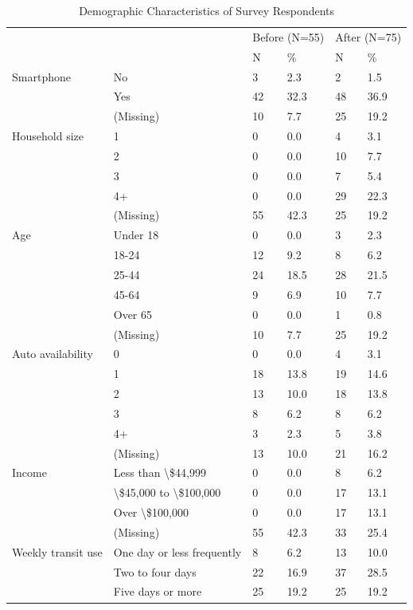\documentclass[smartcities,article,submit,moreauthors,pdftex]{mdpi}
\begin{document}
\begin{table}

\caption{\label{tab:survey-respondents}Demographic Characteristics of Survey Respondents}
\centering
\begin{tabular}[t]{llllll}
\toprule
\multicolumn{2}{c}{ } & \multicolumn{2}{c}{Before (N=55)} & \multicolumn{2}{c}{After (N=75)} \\
\cmidrule(l{3pt}r{3pt}){3-4} \cmidrule(l{3pt}r{3pt}){5-6}
  &    & N & \% & N  & \% \\
\midrule
Smartphone & No & 3 & 2.3 & 2 & 1.5\\
 & Yes & 42 & 32.3 & 48 & 36.9\\
 & (Missing) & 10 & 7.7 & 25 & 19.2\\
Household size & 1 & 0 & 0.0 & 4 & 3.1\\
 & 2 & 0 & 0.0 & 10 & 7.7\\
 & 3 & 0 & 0.0 & 7 & 5.4\\
 & 4+ & 0 & 0.0 & 29 & 22.3\\
 & (Missing) & 55 & 42.3 & 25 & 19.2\\
Age & Under 18 & 0 & 0.0 & 3 & 2.3\\
 & 18-24 & 12 & 9.2 & 8 & 6.2\\
 & 25-44 & 24 & 18.5 & 28 & 21.5\\
 & 45-64 & 9 & 6.9 & 10 & 7.7\\
 & Over 65 & 0 & 0.0 & 1 & 0.8\\
 & (Missing) & 10 & 7.7 & 25 & 19.2\\
Auto availability & 0 & 0 & 0.0 & 4 & 3.1\\
 & 1 & 18 & 13.8 & 19 & 14.6\\
 & 2 & 13 & 10.0 & 18 & 13.8\\
 & 3 & 8 & 6.2 & 8 & 6.2\\
 & 4+ & 3 & 2.3 & 5 & 3.8\\
 & (Missing) & 13 & 10.0 & 21 & 16.2\\
Income & Less than \textbackslash{}\$44,999 & 0 & 0.0 & 8 & 6.2\\
 & \textbackslash{}\$45,000 to \textbackslash{}\$100,000 & 0 & 0.0 & 17 & 13.1\\
 & Over \textbackslash{}\$100,000 & 0 & 0.0 & 17 & 13.1\\
 & (Missing) & 55 & 42.3 & 33 & 25.4\\
Weekly transit use & One day or less frequently & 8 & 6.2 & 13 & 10.0\\
 & Two to four days & 22 & 16.9 & 37 & 28.5\\
 & Five days or more & 25 & 19.2 & 25 & 19.2\\
\bottomrule
\end{tabular}
\end{table}
\end{document}
